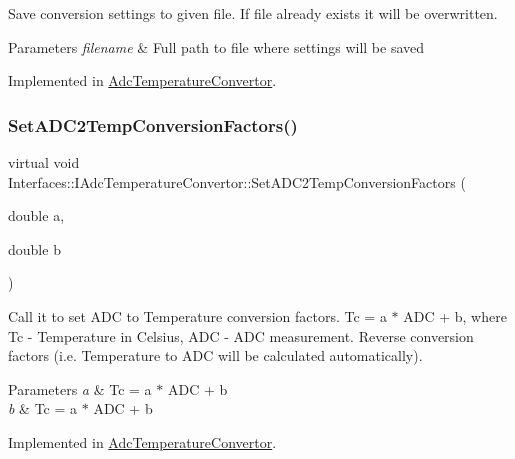 Save conversion settings to given file. If file already exists it will be overwritten. 


\begin{DoxyParams}{Parameters}
{\em filename} & Full path to file where settings will be saved \\
\hline
\end{DoxyParams}


Implemented in \hyperlink{class_adc_temperature_convertor_aa6935469c6bb9e2df9a21495d7e8b72a}{Adc\+Temperature\+Convertor}.

\mbox{\label{class_interfaces_1_1_i_adc_temperature_convertor_a3e4c9204b3593bc434a041c7a69c430f}} 
\subsubsection{\texorpdfstring{Set\+A\+D\+C2\+Temp\+Conversion\+Factors()}{SetADC2TempConversionFactors()}}
{\footnotesize\ttfamily virtual void Interfaces\+::\+I\+Adc\+Temperature\+Convertor\+::\+Set\+A\+D\+C2\+Temp\+Conversion\+Factors (\begin{DoxyParamCaption}\item[{double}]{a,  }\item[{double}]{b }\end{DoxyParamCaption})\hspace{0.3cm}{\ttfamily [pure virtual]}}



Call it to set A\+DC to Temperature conversion factors. Tc = a $\ast$ A\+DC + b, where Tc -\/ Temperature in Celsius, A\+DC -\/ A\+DC measurement. Reverse conversion factors (i.\+e. Temperature to A\+DC will be calculated automatically). 


\begin{DoxyParams}{Parameters}
{\em a} & Tc = a $\ast$ A\+DC + b \\
\hline
{\em b} & Tc = a $\ast$ A\+DC + b \\
\hline
\end{DoxyParams}


Implemented in \hyperlink{class_adc_temperature_convertor_a4850843e55992608213cc9cf82d36830}{Adc\+Temperature\+Convertor}.

